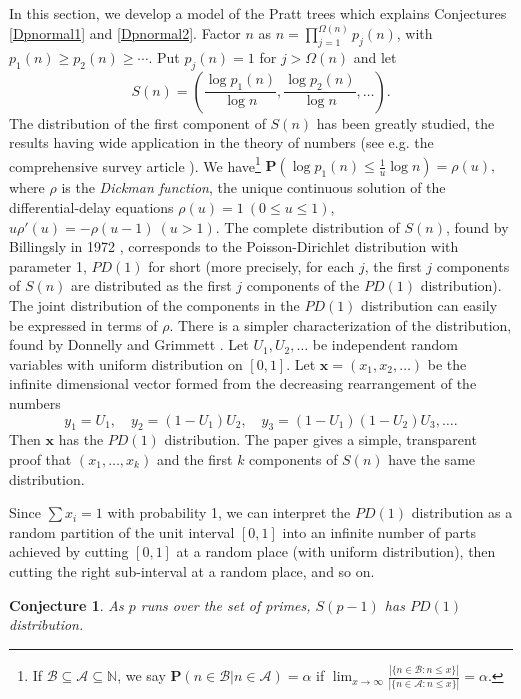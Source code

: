 \documentclass[12pt]{amsart}
\theoremstyle{remark}
\theoremstyle{plain}
\newtheorem{conj}{Conjecture}
\numberwithin{equation}{section}
\newcommand{\NN}{{\mathbb N}}
\newcommand{\PPP}{\mathbf P}
\newcommand{\be}{\begin{equation}}
\newcommand{\ee}{\end{equation}}
\renewcommand{\a}{\ensuremath{\alpha}}
\renewcommand{\(}{\left(}
\renewcommand{\)}{\right)}
\newcommand{\xx}{\ensuremath{\mathbf{x}}}
\renewcommand{\le}{\leqslant}
\renewcommand{\ge}{\geqslant}
\begin{document}
In this section, we develop a model of the Pratt trees which
explains Conjectures \ref{Dpnormal1} and \ref{Dpnormal2}.  Factor $n$
as $n=\prod_{j=1}^{\Omega(n)} p_j(n)$, with $p_1(n) \ge   p_2(n) \ge
\cdots$.  Put $p_j(n)=1$ for $j>\Omega(n)$ and let
$$
S(n) = \( \frac{\log p_1(n)}{\log n}, \frac{\log p_2(n)}{\log n}, \ldots\).
$$
The distribution of the first component of $S(n)$ has been greatly
studied, the results having wide application in the theory of numbers
(see e.g. the comprehensive survey article \cite{HT}).
We have\footnote{If $\mathcal{B} \subseteq \mathcal{A}\subseteq \NN$, we say
 $\PPP(n\in \mathcal{B} | n\in \mathcal{A})=\a$ if
$\displaystyle \lim_{x\to\infty} \frac{| \{ n\in \mathcal{B} : n\le x \}|}{ |\{n\in 
\mathcal{A}: n\le x \}|} = \a.$}
 $\PPP ( \log p_1(n) \le \frac{1}{u}\log n ) = \rho(u),$
where $\rho$
is the \emph{Dickman function}, the unique continuous solution of the
differential-delay equations
$\rho(u)=1 \ (0\le u\le 1)$, $u\rho'(u)=-\rho(u-1) \ (u>1)$.
The complete distribution of $S(n)$, found by
Billingsly in 1972 \cite{Bi}, corresponds to the Poisson-Dirichlet
distribution with parameter 1, $PD(1)$ for short (more precisely,
for each $j$, the first $j$ components of $S(n)$ are distributed as
the first $j$ components of the $PD(1)$ distribution). 
 The joint distribution of the
components in the $PD(1)$ distribution can easily be expressed in terms of
$\rho$.
There is a simpler characterization of
the distribution, found by Donnelly and Grimmett \cite{DG}.  Let
$U_1, U_2, \ldots$ be independent random variables with uniform
distribution on $[0,1]$. Let $\xx=(x_1,x_2,\ldots)$ be the infinite
dimensional vector formed from the decreasing rearrangement of the
numbers 
\be\label{Un} y_1=U_1, \quad y_2=(1-U_1)U_2, \quad
y_3=(1-U_1)(1-U_2)U_3, \ldots. 
\ee 
Then $\xx$ has the $PD(1)$
distribution. The paper \cite{DG} gives a simple, transparent proof
that $(x_1,\ldots,x_k)$ and the first $k$ components of $S(n)$ have
the same distribution. 

Since $\sum x_i = 1$ with probability 1,
we can interpret the $PD(1)$ distribution as a
random partition of the unit interval $[0,1]$ into an infinite number
of parts achieved by cutting $[0,1]$ at a random place (with uniform
distribution), then
cutting the right sub-interval at a random place, and so on.
\begin{conj}\label{PD(p-1)}
As $p$ runs over the set of primes, $S(p-1)$ has $PD(1)$ distribution.
\end{conj}
\end{document}
